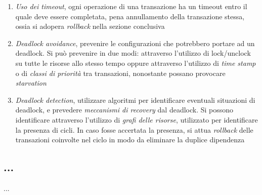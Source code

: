 \documentclass{article}
\begin{document}
\begin{enumerate}[label={-}]
    \item \textit{Uso dei timeout}, ogni operazione di una transazione ha un timeout entro il quale deve essere completata, pena annullamento della transazione stessa, ossia si adopera \textit{rollback} nella sezione conclusiva
    \item \textit{Deadlock avoidance}, prevenire le configurazioni che potrebbero portare ad un deadlock. Si può prevenire in due modi: attraverso l'utilizzo di lock/unclock su tutte le risorse allo stesso tempo oppure attraverso l'utilizzo di \textit{time stamp} o di \textit{classi di priorità} tra transazioni, nonostante possano provocare \textit{starvation}
    \item \textit{Deadlock detection}, utilizzare algoritmi per identificare eventuali situazioni di deadlock, e prevedere \textit{meccanismi di recovery} dal deadlock. Si possono identificare attraverso l'utilizzo di \textit{grafi delle risorse}, utilizzato per identificare la presenza di cicli. In caso fosse accertata la presenza, si attua \textit{rollback} delle transazioni coinvolte nel ciclo in modo da eliminare la duplice dipendenza
\end{enumerate}

\subsection*{...}
\large
...
\end{document}
